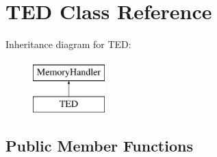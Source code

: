 \hypertarget{class_t_e_d}{}\section{T\+ED Class Reference}
\label{class_t_e_d}
Inheritance diagram for T\+ED\+:\begin{figure}[H]
\begin{center}
\leavevmode
\includegraphics[height=2.000000cm]{class_t_e_d}
\end{center}
\end{figure}
\subsection*{Public Member Functions}
